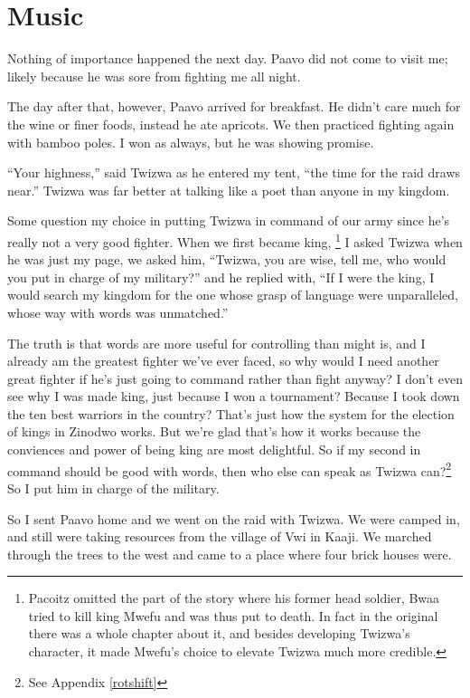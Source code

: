 \chapter{Music}

Nothing of importance happened the next day. Paavo did not come to visit me; likely because he was sore from fighting me all night.

The day after that, however, Paavo arrived for breakfast. He didn't care much for the wine or finer foods, instead he ate apricots. We then practiced fighting again with bamboo poles. I won as always, but he was showing promise.

``Your highness,'' said Twizwa as he entered my tent, ``the time for the raid draws near.'' Twizwa was far better at talking like a poet than anyone in my kingdom.

Some question my choice in putting Twizwa in command of our army since he's really not a very good fighter. When we first became king,
\footnote{Pacoitz omitted the part of the story where his former head soldier, Bwaa tried to kill king Mwefu and was thus put to death. In fact in the original there was a whole chapter about it, and besides developing Twizwa's character, it made Mwefu's choice to elevate Twizwa much more credible.}
I asked Twizwa when he was just my page, we asked him, ``Twizwa, you are wise, tell me, who would you put in charge of my military?'' and he replied with, ``If I were the king, I would search my kingdom for the one whose grasp of language were unparalleled, whose way with words was unmatched.''

The truth is that words are more useful for controlling than might is, and I already am the greatest fighter we've ever faced, so why would I need another great fighter if he's just going to command rather than fight anyway? I don't even see why I was made king, just because I won a tournament? Because I took down the ten best warriors in the country? That's just how the system for the election of kings in Zinodwo works. But we're glad that's how it works because the conviences and power of being king are most delightful.
So if my second in command should be good with words, then who else can speak as Twizwa can?\footnote{See Appendix \ref{rotshift}} So I put him in charge of the military.

So I sent Paavo home and we went on the raid with Twizwa. We were camped in, and still were taking resources from the village of Vwi in Kaaji. We marched through the trees to the west and came to a place where four brick houses were.

